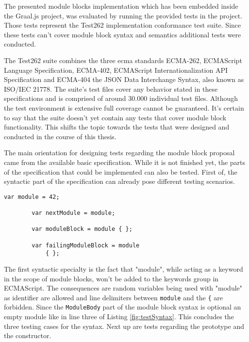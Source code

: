 The presented module blocks implementation which has been embedded inside the Graal.js project, was evaluated by running the provided tests in the project. Those tests represent the Test262 implementation conformance test suite. \cite{ecmaTest262} Since these tests can't cover module block syntax and semantics additional tests were conducted.

The Test262 suite combines the three ecma standards ECMA-262, ECMAScript Language Specification, ECMA-402, ECMAScript Internationalization API Specification and ECMA-404 the JSON Data Interchange Syntax, also known as ISO/IEC 21778. The suite's test files cover any  behavior stated in these specifications and is comprised of around 30.000 individual test files. \cite{ecmaTest262, ecmaTestSpec} Although the test environment is extensive full coverage cannot be guaranteed. It's certain to say that the suite doesn't yet contain any tests that cover module block functionality. This shifts the topic towards the tests that were designed and conducted in the course of this thesis.

The main orientation for designing tests regarding the module block proposal came from the available basic specification. While it is not finished yet, the parts of the specification that could be implemented can also be tested. First of, the syntactic part of the specification can already pose different testing scenarios.

    \begin{lstlisting}[caption={Module block syntax tests}, label={fig:testSyntax}]
        var module = 42;
        
        var nextModule = module;
        
        var moduleBlock = module { };
        
        var failingModuleBlock = module
            { };
    \end{lstlisting}

The first syntactic specialty is the fact that "module", while acting as a keyword in the scope of module blocks, won't be added to the keywords group in ECMAScript. The consequences are random variables being used with "module" as identifier are allowed and line delimiters between \texttt{module} and the \texttt{\{} are forbidden. Since the \texttt{ModuleBody} part of the module block syntax  is optional an empty module like in line three of Listing \ref{fig:testSyntax}. This concludes the three testing cases for the syntax. Next up are tests regarding the prototype and the constructor.

